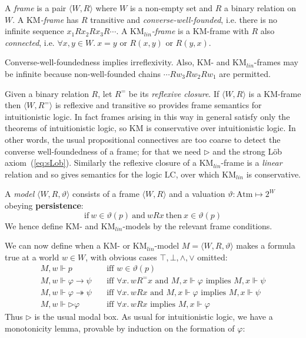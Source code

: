 \documentclass[envcountsect,envcountsame]{llncs}
\newcommand{\atms}{\mathrm{Atm}}
\newcommand{\eqref}[1]{(\ref{#1})}
\newcommand{\forces}{\Vdash}
\newcommand{\iimp}{\twoheadrightarrow}
\newcommand{\lcnxt}{\mathrm{KM}_{lin}}
\newcommand{\lgkm}{\mathrm{KM}}
\newcommand{\lglc}{\mathrm{LC}}
\newcommand{\limp}{\rightarrow}
\newcommand{\nxt}{\rhd}
\newcommand{\later}{\nxt}
\newcommand{\rel}{R}
\newcommand{\releq}{R^{=}}
\begin{document}
\begin{definition}\label{def:frame_conds}
A \emph{frame} is a pair $\langle W,\rel\rangle$ where $W$ is a non-empty set and
$\rel$ a binary relation on $W$. A \emph{$\lgkm$-frame} has $\rel$ transitive and
\emph{converse-well-founded}, i.e.
there is no infinite sequence $x_1\rel x_2 \rel x_3 \rel \cdots$.
A \emph{$\lcnxt$-frame} is a $\lgkm$-frame with $\rel$ also \emph{connected}, i.e.
$\forall x,y\in W.~x=y$ or $\rel(x,y)$ or $\rel(y,x)$.
\end{definition}

Converse-well-foundedness implies irreflexivity. Also,
$\lgkm$- and $\lcnxt$-frames may be infinite because non-well-founded chains
$\cdots \rel w_3 \rel w_2 \rel w_1$ are permitted.

Given a binary relation $\rel$, let $\releq$ be its \emph{reflexive closure}. If
$\langle W,\rel \rangle$ is a $\lgkm$-frame then $\langle W,\releq \rangle$ is reflexive
and transitive so provides frame semantics for intuitionistic logic. In fact frames arising
in this way in general satisfy only the theorems
of intuitionistic logic, so $\lgkm$ is conservative over intuitionistic logic. In other words,
the usual propositional connectives are too coarse to detect the converse
well-foundedness of a frame; for that we need $\nxt$ and the strong
L\"ob axiom~\eqref{eq:sLob}. Similarly the reflexive closure of a $\lcnxt$-frame is a
\emph{linear} relation and so gives semantics for the logic $\lglc$, over which $\lcnxt$
is conservative.


A \emph{model} 
$\langle W, \rel, \vartheta \rangle$
consists of a frame
$\langle W, \rel \rangle$ 
and a valuation 
$\vartheta: \atms\mapsto 2^{W}$ 
obeying
\textbf{persistence}:
\[
\mathrm{if~} 
w \in \vartheta(p) 
\mathrm{~and~}
w \rel x
\mathrm{~then~}
x \in \vartheta(p) 
\]
We hence define $\lgkm$- and $\lcnxt$-models by the relevant frame conditions.

We can now define when a $\lgkm$- or $\lcnxt$-model $M=\langle W, \rel, \vartheta \rangle$ makes a formula true at a world $w\in W$, with obvious cases $\top,\bot,\land,\lor$ omitted:
$$\begin{array}{ll}
  M,w\forces p &\mbox{iff $w\in\vartheta(p)$} \\
M,w\forces \varphi\limp\psi \quad &
    \mbox{iff } \forall x.\,w\releq x\mbox{ and }
    M,x\forces\varphi\mbox{ implies }M,x\forces\psi \\
  M,w\forces \varphi\iimp\psi \quad &
    \mbox{iff } \forall x.\,w\rel x\mbox{ and }
    M,x\forces\varphi\mbox{ implies }M,x\forces\psi \\
  M,w\forces \later\varphi &
    \mbox{iff } \forall x.\,w\rel x\mbox{ implies }
    M,x\forces\varphi
\end{array}$$
Thus $\later$ is the usual modal box. 
As usual for intuitionistic logic, we have a monotonicity lemma, provable
by induction on the formation of $\varphi$:
\end{document}

